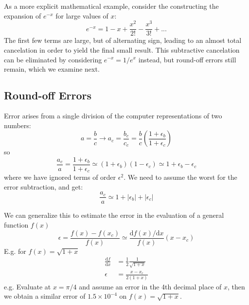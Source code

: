 \documentclass[../../../main.tex]{subfiles}
\begin{document}
As a more explicit mathematical example, consider the constructing the expansion of $e^{-x}$ for large values of $x$:
\begin{equation*}
    e^{-x} = 1 - x + \frac{x^2}{2!} - \frac{x^3}{3!} + ... 
\end{equation*}
The first few terms are large, but of alternating sign, leading to an almost total cancelation in order to yield the final small result. 
This subtractive cancelation can be eliminated by considering $e^{-x} = 1/e^x$ instead, but round-off errors still remain, which we examine next. 

\subsection{Round-off Errors} 
Error arises from a single division of the computer representations of two numbers:
\begin{equation*}
    a = \frac{b}{c} \rightarrow a_c = \frac{b_c}{c_c} = \frac{b}{c} \left( \frac{1+\epsilon_b}{1+\epsilon_c} \right)
\end{equation*}
so
\begin{equation*}
    \frac{a_c}{a} = \frac{1+\epsilon_b}{1+\epsilon_c} \simeq (1+\epsilon_b) (1- \epsilon_c) \simeq 1 + \epsilon_b - \epsilon_c
\end{equation*}
where we have ignored terms of order $\epsilon^2$. 
We need to assume the worst for the error subtraction, and get:
\begin{equation*}
    \frac{a_c}{a} \simeq 1 + |\epsilon_b| + |\epsilon_c|
\end{equation*}

We can generalize this to estimate the error in the evaluation of a general function $f(x)$
\begin{equation*}
    \epsilon = \frac{ f(x) - f(x_c) } { f(x) } \simeq \frac{\mathrm{d} f(x) / \mathrm{d}x}{f(x)} (x-x_c)
\end{equation*}
E.g. for $f(x) = \sqrt{1+x}$
\begin{align*}
    \frac{ \mathrm{d} f}{\mathrm{d}x} &= \frac{1}{2} \frac{1}{\sqrt{1+x}}\\ 
    \epsilon &= \frac{x - x_c}{2 (1+x) }
\end{align*}
e.g. Evaluate at $x=\pi/4$ and assume an error in the 4th decimal place of $x$, then we obtain a similar error of $1.5\times 10^{-4}$ on $f(x) = \sqrt{1+x}$. 
\end{document}
